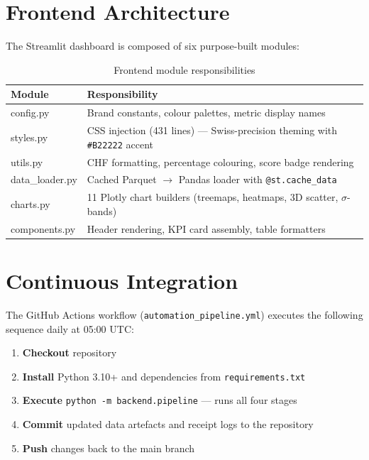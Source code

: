 \documentclass[
  11pt,
  a4paper,
  twoside,
  openany
]{report}
\begin{document}
\section{Frontend Architecture}

The Streamlit dashboard is composed of six purpose-built modules:

\begin{table}[H]
\centering
\caption{Frontend module responsibilities}
\label{tab:frontend-modules}
\begin{tabularx}{\textwidth}{>{\ttfamily}l X}
\toprule
\textbf{Module} & \textbf{Responsibility} \\
\midrule
config.py       & Brand constants, colour palettes, metric display names \\
styles.py       & CSS injection (431 lines) — Swiss-precision theming with \texttt{\#B22222} accent \\
utils.py        & CHF formatting, percentage colouring, score badge rendering \\
data\_loader.py & Cached Parquet $\to$ Pandas loader with \texttt{@st.cache\_data} \\
charts.py       & 11 Plotly chart builders (treemaps, heatmaps, 3D scatter, $\sigma$-bands) \\
components.py   & Header rendering, KPI card assembly, table formatters \\
\bottomrule
\end{tabularx}
\end{table}

\section{Continuous Integration}

The GitHub Actions workflow (\texttt{automation\_pipeline.yml}) executes the following sequence daily at 05:00 UTC:

\begin{enumerate}
  \item \textbf{Checkout} repository
  \item \textbf{Install} Python 3.10+ and dependencies from \texttt{requirements.txt}
  \item \textbf{Execute} \texttt{python -m backend.pipeline} — runs all four stages
  \item \textbf{Commit} updated data artefacts and receipt logs to the repository
  \item \textbf{Push} changes back to the main branch
\end{enumerate}
\end{document}
